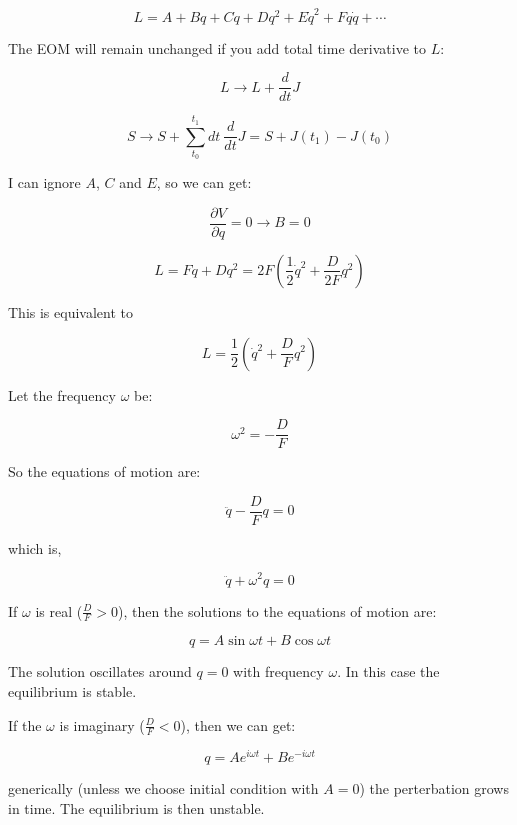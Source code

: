 \begin{equation}
    L = A + Bq + C\dot{q} + Dq^2 + E\dot{q}^2 + Fq\dot{q} + \cdots
\end{equation}

The EOM will remain unchanged if you add total time derivative to $L$:

\begin{equation}
    L \rightarrow L + \frac{d}{dt} J 
\end{equation}

\begin{equation}
    S \rightarrow S + \sum_{t_0}^{t_1} dt \ \frac{d}{dt} J = S + J\left(t_1\right) - J\left(t_0\right)
\end{equation}

I can ignore $A$, $C$ and $E$, so we can get:

\begin{equation}
    \frac{\partial V}{\partial q} = 0 \rightarrow B = 0
\end{equation}

\begin{equation}
    L = F \dot{q} + D q^2 = 2F \left(\frac{1}{2} \dot{q}^2 + \frac{D}{2F} q^2\right)
\end{equation}

This is equivalent to 

\begin{equation}
    L = \frac{1}{2} \left(\dot{q}^2 + \frac{D}{F} q^2\right)
\end{equation}

Let the frequency $\omega$ be:

\begin{equation}
    \omega^2 = - \frac{D}{F}
\end{equation}

So the equations of motion are: 

\begin{equation}
    \ddot{q} - \frac{D}{F} q = 0
\end{equation}

which is,

\begin{equation}
    \ddot{q} + \omega^2 q = 0
\end{equation}

If $\omega$ is real ($\frac{D}{F} > 0$), then the solutions to the equations of motion are:

\begin{equation}
    q = A \sin{\omega t} + B \cos{\omega t}
\end{equation}  

The solution oscillates around $q = 0$ with frequency $\omega$. In this case the equilibrium is stable.

If the $\omega$ is imaginary ($\frac{D}{F} < 0$), then we can get:

\begin{equation}
    q = A e^{i \omega t} + B e^{-i \omega t}
\end{equation}

generically (unless we choose initial condition with $A = 0$) the perterbation grows in time. The equilibrium is then unstable.